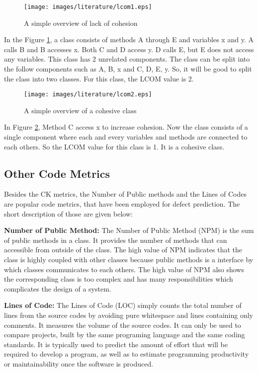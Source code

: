 \documentclass[12pt]{report}
\begin{document}
\begin{figure}[h!]
  \centering
    \texttt{[image: images/literature/lcom1.eps]}
		\caption{A simple overview of lack of cohesion}
		\label{lcom1}
\end{figure}


In the Figure \ref{lcom1}, a class consists of methods A through E and variables x and y. A calls B and B accesses x. Both C and D access y. D calls E, but E does not access any variables. This class has 2 unrelated components. The class can be split into the follow components such as {A, B, x} and {C, D, E, y}. So, it will be good to split the class into two classes. For this class, the LCOM value is 2. 
\begin{figure}[h!]
  \centering
    \texttt{[image: images/literature/lcom2.eps]}
		\caption{A simple overview of a cohesive class}
		\label{lcom2}
\end{figure}

In Figure \ref{lcom2}, Method C access x to increase cohesion. Now the class consists of a single component where each and every variables and methods are connected to each others. So the LCOM value for this class is 1. It is a cohesive class. 

\subsection{ Other Code Metrics}
Besides the CK metrics, the Number of Public methods and the Lines of Codes are popular code metrics, that have been employed for defect prediction. The short description of those are given below:

\textbf{Number of Public Method:}
The Number of Public Method (NPM) is the sum of public methods in a class. It provides the number of methods that can accessible from outside of the class. The high value of NPM indicates that the class is highly coupled with other classes because public methods is a interface by which classes communicates to each others. The high value of NPM also shows the corresponding class is too complex and has many responsibilities which complicates the design of a system.

\textbf{Lines of Code:}
The Lines of Code (LOC) simply counts the total number of lines from the source codes by avoiding pure whitespace and lines containing only comments. It measures the volume of the source codes. It can only be used to compare projects, built by the same programing language and the same coding standards. It is typically used to predict the amount of effort that will be required to develop a program, as well as to estimate programming productivity or maintainability once the software is produced.
\end{document}
